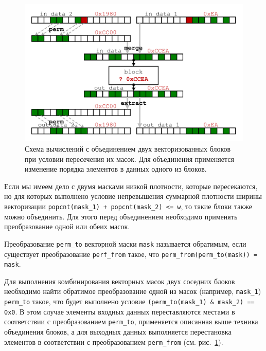 \begin{figure}[ht]
\centering
\includegraphics[width=1.0\textwidth]{./fig/vec_masks_comb.pdf}
\singlespacing
{}\caption{Схема вычислений с объединением двух векторизованных блоков при условии пересечения их масок. Для объединения применяется изменение порядка элементов в данных одного из блоков.}
\label{fig:text_4_vec_comb_mask_comb_masks_perm}
\end{figure}

Если мы имеем дело с двумя масками низкой плотности, которые пересекаются, но для которых выполнено условие непревышения суммарной плотности ширины векторизации\label{term:vec_shir3} \texttt{popcnt(mask\_1) + popcnt(mask\_2) <= w}, то такие блоки также можно объединить.
Для этого перед объединением необходимо применять преобразование одной или обеих масок.

\begin{definition}
Преобразование \texttt{perm\_to} векторной маски \texttt{mask} называется обратимым, если существует преобразование \texttt{perf\_from} такое, что \texttt{perm\_from(perm\_to(mask)) = mask}.
\end{definition}

Для выполнения комбинирования векторных масок двух соседних блоков необходимо найти обратимое преобразование одной из масок (например, \texttt{mask\_1}) \texttt{perm\_to} такое, что будет выполнено условие \texttt{(perm\_to(mask\_1) \& mask\_2) == 0x0}.
В этом случае элементы входных данных переставляются местами в соответствии с преобразованием \texttt{perm\_to}, применяется описанная выше техника объединения блоков, а для выходных данных выполняется перестановка элементов в соответствии с преобразованием \texttt{perm\_from} (см. рис.~\ref{fig:text_4_vec_comb_mask_comb_masks_perm}).

